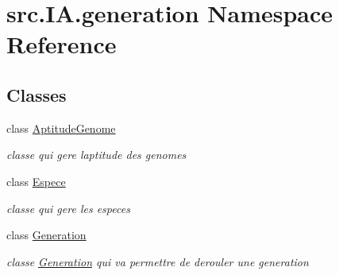 \hypertarget{namespacesrc_1_1_i_a_1_1generation}{}\section{src.\+I\+A.\+generation Namespace Reference}
\label{namespacesrc_1_1_i_a_1_1generation}
\subsection*{Classes}
\begin{DoxyCompactItemize}
\item 
class \hyperlink{classsrc_1_1_i_a_1_1generation_1_1_aptitude_genome}{Aptitude\+Genome}
\begin{DoxyCompactList}\small\item\em classe qui gere l\textquotesingle{}aptitude des genomes \end{DoxyCompactList}\item 
class \hyperlink{classsrc_1_1_i_a_1_1generation_1_1_espece}{Espece}
\begin{DoxyCompactList}\small\item\em classe qui gere les especes \end{DoxyCompactList}\item 
class \hyperlink{classsrc_1_1_i_a_1_1generation_1_1_generation}{Generation}
\begin{DoxyCompactList}\small\item\em classe \hyperlink{classsrc_1_1_i_a_1_1generation_1_1_generation}{Generation} qui va permettre de derouler une generation \end{DoxyCompactList}\end{DoxyCompactItemize}

